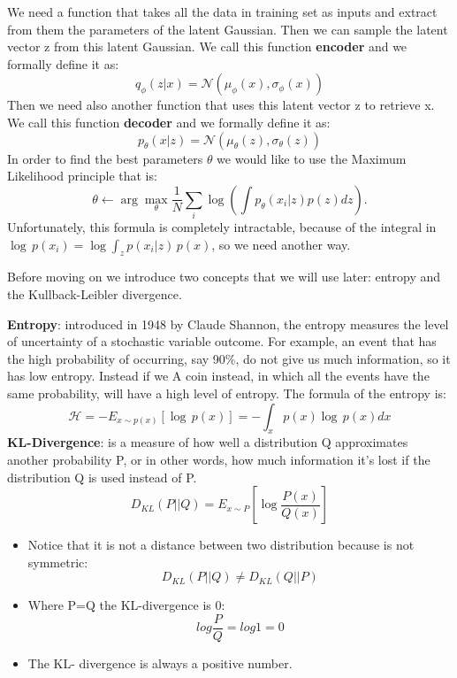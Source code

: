 We need a function that takes all the data in training set as inputs and extract from them the parameters of the latent Gaussian.
Then we can sample the latent vector z from this latent Gaussian.  
We call this function \textbf{encoder} and we formally define it as:
\begin{equation*}
q_\phi(z|x) = \mathcal{N}(\mu_\phi(x),\sigma_\phi(x))
\end{equation*}
Then we need also another function that uses this latent vector z to retrieve x.
We call this function \textbf{decoder} and we formally define it as:
\begin{equation*}
p_\theta(x|z) = \mathcal{N}(\mu_\theta(z),\sigma_\theta(z))
\end{equation*}
In order to find the best parameters $\theta$ we would like to use the Maximum Likelihood principle that is:
\begin{equation}
\label{intractable}
\theta \leftarrow \arg \max_{\theta} \frac{1}{N} \sum_{i} \log \left ( \int p_\theta(x_i|z)p(z)dz \right ).
\end{equation}
Unfortunately, this formula is completely intractable, because of the integral in $ \log\, p(x_i) = \log \int_z p(x_i|z) \, p(x)$, so we need another way.

Before moving on we introduce two concepts that we will use later: entropy and the Kullback-Leibler divergence.

\textbf{Entropy}:  introduced in 1948 by Claude Shannon, the entropy measures the level of uncertainty of a stochastic variable outcome.
For example, an event that has the high probability of occurring, say 90\%, do not give us much information, so it has low entropy.
Instead if we A coin instead, in which all the events have the same probability, will have a high level of entropy.
The formula of the entropy is:
\begin{equation*}
\mathcal{H} = -E_{x\sim p(x)} \left [ \log\, p(x) \right] = - \int_{x} p(x) \log \,p(x) dx
\end{equation*}
\textbf{KL-Divergence}: is a measure of how well a distribution Q approximates another probability P, or in other words, how much information it's lost if the distribution Q is used instead of P.
\begin{equation*}
D_{KL} (P||Q) = E_{x \sim P} \left [ \log \frac{P(x)}{Q(x)} \right] 
\end{equation*}

\begin{itemize}
\item Notice that it is not a distance between two distribution because is not symmetric:\begin{equation*}
 D_{KL}(P || Q) \neq D_{KL}(Q|| P)
 \end{equation*}
\item Where P=Q the KL-divergence is 0:\begin{equation*}
 log  \frac{P}{Q} = log 1 = 0
 \end{equation*}
\item The KL- divergence is always a positive number.
\end{itemize}

